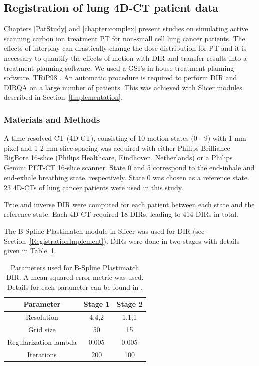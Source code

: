 \subsection{Registration of lung 4D-CT patient data}
\label{lungDIR}

Chapters \ref{PatStudy} and \ref{chapter:complex} present studies on simulating active scanning carbon ion treatment PT for non-small cell lung cancer patients. The effects of interplay can drastically change the dose distribution for PT and it is necessary to quantify the effects of motion with DIR and transfer results into a treatment planning software. We used a GSI's in-house treatment planning software, TRiP98 \cite{Kraemer2000a, Richter2013}. An automatic procedure is required to perform DIR and DIRQA on a large number of patients. This was achieved with Slicer modules described in Section~\ref{Implementation}.

\subsubsection{Materials and Methods}

A time-resolved CT (4D-CT), consisting of 10 motion states (0 - 9) with 1 mm pixel and 1-2 mm slice spacing was acquired with either Philips Brilliance BigBore 16-slice 
(Philips Healthcare, Eindhoven, Netherlands) or a Philips Gemini PET-CT 16-slice scanner. 
State 0 and 5 correspond to the end-inhale and end-exhale breathing state, respectively. State 0 was chosen as a reference state. 23 4D-CTs of lung cancer patients were used in this study.

True and inverse DIR were computed for each patient between each state and the reference state. Each 4D-CT required 18 DIRs, leading to 414 DIRs in total.

The B-Spline Plastimatch module in Slicer was used for DIR (see Section~\ref{RegistrationImplement}). DIRs were done in two stages with details given in Table~\ref{tab:stages}. 

\begin{table}[H]
  \centering
  \caption{Parameters used for B-Spline Plastimatch DIR. A mean squared error metric was used. Details for each parameter can be found in \cite{Plastimatch}.}
  \begin{tabular}{c|c|c}
      Parameter & Stage 1 & Stage 2 \\
      \hline
      Resolution & 4,4,2 & 1,1,1 \\
      Grid size & 50 & 15 \\
      Regularization lambda & 0.005 & 0.005 \\
      Iterations & 200 & 100 \\
    \hline\hline
  \end{tabular}
  \label{tab:stages}
\end{table}

